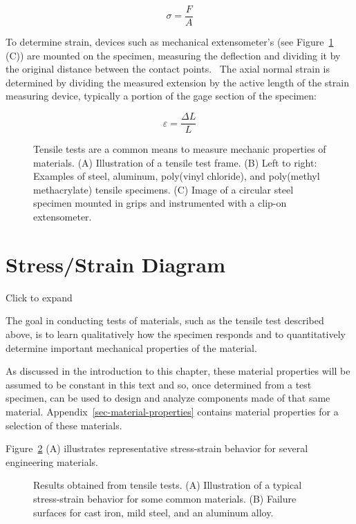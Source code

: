 \documentclass[
  letterpaper,
  DIV=11,
  numbers=noendperiod]{scrreprt}
\theoremstyle{definition}
\theoremstyle{remark}
\begin{document}
\[
\sigma=\frac{F}{A}
\]

To determine strain, devices such as mechanical extensometer's (see
Figure~\ref{fig-4.1} (C)) are mounted on the specimen, measuring the
deflection and dividing it by the original distance between the contact
points.~ The axial normal strain is determined by dividing the measured
extension by the active length of the strain measuring device, typically
a portion of the gage section of the specimen:

\[
\varepsilon=\frac{\Delta L}{L}
\]

\begin{figure}


\caption{\label{fig-4.1}Tensile tests are a common means to measure
mechanic properties of materials. (A) Illustration of a tensile test
frame. (B) Left to right: Examples of steel, aluminum, poly(vinyl
chloride), and poly(methyl methacrylate) tensile specimens. (C) Image of
a circular steel specimen mounted in grips and instrumented with a
clip-on extensometer.}

\end{figure}%

\section{Stress/Strain Diagram}\label{sec-4.2}

Click to expand

The goal in conducting tests of materials, such as the tensile test
described above, is to learn qualitatively how the specimen responds and
to quantitatively determine important mechanical properties of the
material.

As discussed in the introduction to this chapter, these material
properties will be assumed to be constant in this text and so, once
determined from a test specimen, can be used to design and analyze
components made of that same material.
Appendix~\ref{sec-material-properties} contains material properties for
a selection of these materials.

Figure~\ref{fig-4.2} (A) illustrates representative stress-strain
behavior for several engineering materials.

\begin{figure}


\caption{\label{fig-4.2}Results obtained from tensile tests. (A)
Illustration of a typical stress-strain behavior for some common
materials. (B) Failure surfaces for cast iron, mild steel, and an
aluminum alloy.}

\end{figure}%
\end{document}
